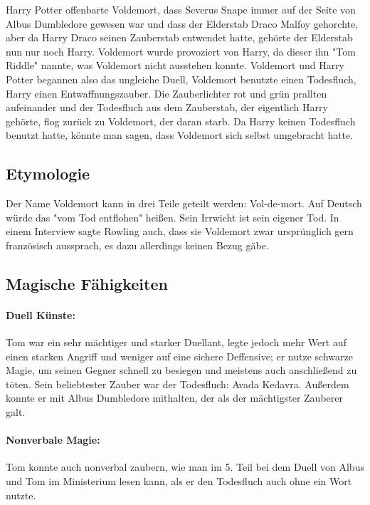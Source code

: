 \documentclass[a4paper, 10pt]{article}
\begin{document}
\newline
{}  
Harry Potter offenbarte Voldemort, dass Severus Snape immer auf der Seite von Albus Dumbledore gewesen war und dass der Elderstab Draco Malfoy gehorchte, aber da Harry Draco seinen Zauberstab entwendet hatte, gehörte der Elderstab nun nur noch Harry. Voldemort wurde provoziert von Harry, da dieser ihn "Tom Riddle" nannte, was Voldemort nicht ausstehen konnte.
\vspace{10pt}
\newline
{}  
Voldemort und Harry Potter begannen also das ungleiche Duell, Voldemort benutzte einen Todesfluch, Harry einen Entwaffnungszauber. Die Zauberlichter rot und grün prallten aufeinander und der Todesfluch aus dem Zauberstab, der eigentlich Harry gehörte, flog zurück zu Voldemort, der daran starb. Da Harry keinen Todesfluch benutzt hatte, könnte man sagen, dass Voldemort sich selbst umgebracht hatte.

\subsection*{\Large Etymologie}
Der Name Voldemort kann in drei Teile geteilt werden: Vol-de-mort. Auf Deutsch würde das "vom Tod entflohen" heißen.
\vspace{10pt}
\newline
{}  
Sein Irrwicht ist sein eigener Tod. In einem Interview sagte Rowling auch, dass sie Voldemort zwar ursprünglich gern französisch aussprach, es dazu allerdings keinen Bezug gäbe.

\subsection*{\Large Magische Fähigkeiten}
\paragraph{Duell Künste:}  
Tom war ein sehr mächtiger und starker Duellant, legte jedoch mehr Wert auf einen starken Angriff und weniger auf eine sichere Deffensive; er nutze schwarze Magie, um seinen Gegner schnell zu besiegen und meistens auch anschließend zu töten. Sein beliebtester Zauber war der Todesfluch: Avada Kedavra. Außerdem konnte er mit Albus Dumbledore mithalten, der als der mächtigster Zauberer galt.
\paragraph{Nonverbale Magie:}  
Tom konnte auch nonverbal zaubern, wie man im 5. Teil bei dem Duell von Albus und Tom im Ministerium lesen kann, als er den Todesfluch auch ohne ein Wort nutzte.
\end{document}

